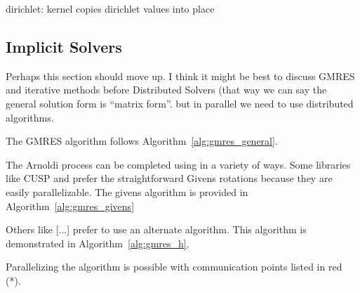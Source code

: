 
dirichlet: kernel copies dirichlet values into place 





 

\subsection{Implicit Solvers}

Perhaps this section should move up. I think it might be best to discuss GMRES and iterative methods before Distributed Solvers (that way we can say the general solution form is ``matrix form''. but in parallel we need to use distributed algorithms.

The GMRES algorithm follows Algorithm~\ref{alg:gmres_general}. 

The Arnoldi process can be completed using in a variety of ways. Some libraries like CUSP and \cite{Saad2003} prefer the straightforward Givens rotations because they are easily parallelizable. The givens algorithm is provided in Algorithm~\ref{alg:gmres_givens}

Others like [...] prefer to use an alternate algorithm. This algorithm is demonstrated in Algorithm~\ref{alg:gmres_h}.

Parallelizing the algorithm is possible with communication points listed in red (*). 

